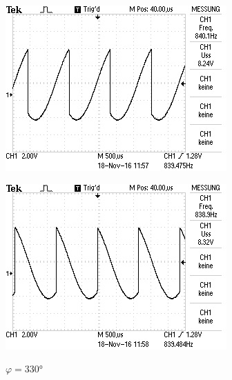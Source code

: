 \begin{figure}[!h]
\hspace{12pt}
\vspace{5pt}
\begin{minipage}[t]{0.3\textwidth}
\includegraphics[width=\textwidth]{Bilder/225.jpg}
\label{fig:5}
\caption{$\varphi = 225\si{\degree}$}
\end{minipage}
\hspace{12pt}
\vspace{5pt}
\begin{minipage}[t]{0.3\textwidth}
\includegraphics[width=\textwidth]{Bilder/330.jpg}
\label{fig:6}
\caption{$\varphi = 330\si{\degree}$}
\end{minipage}
\hspace{12pt}
\vspace{5pt}
\end{figure}

